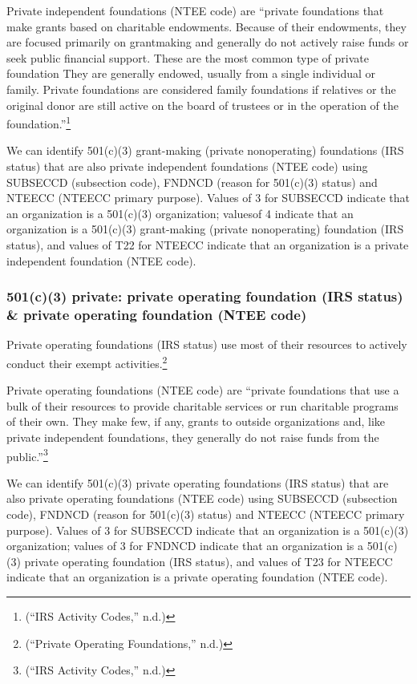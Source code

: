 \documentclass[
  letterpaper,
  DIV=11,
  numbers=noendperiod,
  oneside]{scrreprt}
\begin{document}
Private independent foundations (NTEE code) are ``private foundations
that make grants based on charitable endowments. Because of their
endowments, they are focused primarily on grantmaking and generally do
not actively raise funds or seek public financial support. These are the
most common type of private foundation They are generally endowed,
usually from a single individual or family. Private foundations are
considered family foundations if relatives or the original donor are
still active on the board of trustees or in the operation of the
foundation.''\footnote{({``IRS Activity Codes,''} n.d.)}

We can identify 501(c)(3) grant-making (private nonoperating)
foundations (IRS status) that are also private independent foundations
(NTEE code) using SUBSECCD (subsection code), FNDNCD (reason for
501(c)(3) status) and NTEECC (NTEECC primary purpose). Values of 3 for
SUBSECCD indicate that an organization is a 501(c)(3) organization;
valuesof 4 indicate that an organization is a 501(c)(3) grant-making
(private nonoperating) foundation (IRS status), and values of T22 for
NTEECC indicate that an organization is a private independent foundation
(NTEE code).

\hypertarget{c3-private-private-operating-foundation-irs-status-private-operating-foundation-ntee-code}{%
\subsubsection{501(c)(3) private: private operating foundation (IRS
status) \& private operating foundation (NTEE
code)}\label{c3-private-private-operating-foundation-irs-status-private-operating-foundation-ntee-code}}

Private operating foundations (IRS status) use most of their resources
to actively conduct their exempt activities.\footnote{({``Private
  Operating Foundations,''} n.d.)}

Private operating foundations (NTEE code) are ``private foundations that
use a bulk of their resources to provide charitable services or run
charitable programs of their own. They make few, if any, grants to
outside organizations and, like private independent foundations, they
generally do not raise funds from the public.''\footnote{({``IRS
  Activity Codes,''} n.d.)}

We can identify 501(c)(3) private operating foundations (IRS status)
that are also private operating foundations (NTEE code) using SUBSECCD
(subsection code), FNDNCD (reason for 501(c)(3) status) and NTEECC
(NTEECC primary purpose). Values of 3 for SUBSECCD indicate that an
organization is a 501(c)(3) organization; values of 3 for FNDNCD
indicate that an organization is a 501(c)(3) private operating
foundation (IRS status), and values of T23 for NTEECC indicate that an
organization is a private operating foundation (NTEE code).
\end{document}
